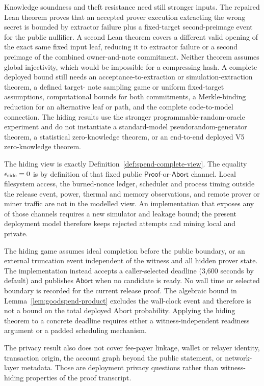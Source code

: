 Knowledge soundness and theft resistance need still stronger inputs.  The
repaired Lean theorem proves that an accepted prover execution extracting the
wrong secret is bounded by extractor failure plus a fixed-target
second-preimage event for the public nullifier.  A second Lean theorem covers a
different valid opening of the exact same fixed input leaf, reducing it to
extractor failure or a second preimage of the combined owner-and-note
commitment.  Neither theorem assumes global injectivity, which would be
impossible for a compressing hash.  A complete deployed bound still needs an
acceptance-to-extraction or simulation-extraction theorem, a defined target-
note sampling game or uniform fixed-target assumptions, computational bounds
for both commitments, a Merkle-binding reduction for an alternative leaf or
path, and the complete code-to-model connection.  The
hiding results use the stronger programmable-random-oracle experiment and do
not instantiate a standard-model pseudorandom-generator theorem, a statistical
zero-knowledge theorem, or an end-to-end deployed V5 zero-knowledge theorem.

The hiding view is exactly Definition~\ref{def:spend-complete-view}.  The
equality \(\epsilon_{\rm side}=0\) is by definition of that fixed public
\(\mathsf{Proof}\)-or-\(\mathsf{Abort}\) channel.  Local filesystem access,
the burned-nonce ledger, scheduler and process timing outside the release
event, power, thermal and memory observations, and remote prover or miner
traffic are not in the modelled view.  An implementation that exposes any of
those channels requires a new simulator and leakage bound; the present
deployment model therefore keeps rejected attempts and mining local and
private.

The hiding game assumes ideal completion before the public boundary, or an
external truncation event independent of the witness and all hidden prover
state.  The implementation instead accepts a caller-selected deadline
(3,600 seconds by default) and publishes \(\mathsf{Abort}\) when no candidate
is ready.  No wall time or selected boundary is recorded for the current
release proof.  The algebraic bound in
Lemma~\ref{lem:goodspend-product} excludes the wall-clock event and therefore is
not a bound on the total deployed Abort probability.  Applying the hiding
theorem to a concrete deadline requires either a witness-independent readiness
argument or a padded scheduling mechanism.

The privacy result also does not cover fee-payer linkage, wallet or relayer
identity, transaction origin, the account graph beyond the public statement,
or network-layer metadata.  Those are deployment privacy questions rather
than witness-hiding properties of the proof transcript.

